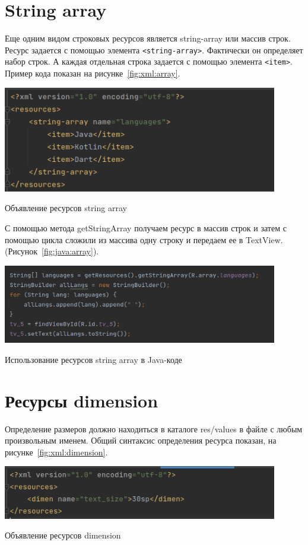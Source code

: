 \section{String array}
Еще одним видом строковых ресурсов является string-array или массив строк.
Ресурс задается с помощью элемента \texttt{<string-array>}. Фактически он
определяет набор строк. А каждая отдельная строка задается с помощью
элемента \texttt{<item>}.
Пример кода показан на рисунке~\ref{fig:xml:array}.

\begin{image}
	\includegraphics[width=0.9\textwidth]{Screenshot from 2023-03-30 19-09-10}
	\caption{Объявление ресурсов string array}
	\label{fig:xml:array}
\end{image}

С помощью метода getStringArray получаем ресурс в массив строк и затем с
помощью цикла сложили из массива одну строку и передаем ее в TextView.
(Рисунок~\ref{fig:java:array}).

\begin{image}
	\includegraphics[width=0.9\textwidth]{Screenshot from 2023-03-30 19-13-31}
	\caption{Использование ресурсов string array в Java-коде}
	\label{fig:java:array}
\end{image}

\section{Ресурсы dimension}
Определение размеров должно находиться в каталоге res/values в файле с
любым произвольным именем. Общий синтаксис определения ресурса показан,
на рисунке~\ref{fig:xml:dimension}.

\begin{image}
	\includegraphics[width=0.9\textwidth]{Screenshot from 2023-03-30 19-18-23}
	\caption{Объявление ресурсов dimension}
	\label{fig:xml:dimension}
\end{image}

